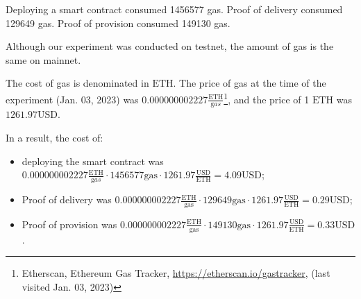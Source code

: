 Deploying a smart contract consumed 1456577 gas.
Proof of delivery consumed 129649 gas.
Proof of provision consumed 149130 gas.

Although our experiment was conducted on testnet, the amount of gas is the same on mainnet.

The cost of gas is denominated in $\mathrm{ETH}$. The price of gas at the time of the experiment (Jan. 03, 2023) was $0.000000002227 \frac{\mathrm{ETH}}{\mathrm gas}$\footnote{Etherscan, Ethereum Gas Tracker, \url{https://etherscan.io/gastracker}, (last visited Jan. 03, 2023)}, and the price of 1 $\mathrm{ETH}$ was $1261.97 \mathrm{USD}$.

In a result, the cost of:
\begin{itemize}
  \item deploying the smart contract was $0.000000002227 \frac{\mathrm{ETH}}{\mathrm gas} \cdot 1456577 \mathrm{gas} \cdot 1261.97 \frac{\mathrm{USD}}{\mathrm{ETH}} = 4.09 \mathrm{USD}$; 
  \item Proof of delivery was $0.000000002227 \mathrm{\frac{ETH}{gas}} \cdot 129649 \mathrm{gas} \cdot 1261.97 \frac{\mathrm{USD}}{\mathrm{ETH}} = 0.29 \mathrm{USD}$; 
  \item Proof of provision was $0.000000002227 \mathrm{\frac{ETH}{gas}} \cdot 149130 \mathrm{gas} \cdot 1261.97 \frac{\mathrm{USD}}{\mathrm{ETH}} = 0.33 \mathrm{USD}$.
\end{itemize}





